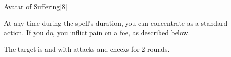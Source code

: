 \begin{spellsection}{Avatar of Suffering}[8]
    \begin{spellheader}
    \end{spellheader}
    \begin{spellcontent}
        \begin{spelltargetinginfo}
        \end{spelltargetinginfo}
        \begin{spelleffects}
            \spelleffect At any time during the spell's duration, you can concentrate as a standard action. If you do, you inflict pain on a foe, as described below.
            \spelldur \durlong
        \end{spelleffects}
    \end{spellcontent}
    \begin{spellsubcontent}
        \begin{spelltargetinginfo}
        \end{spelltargetinginfo}
        \begin{spelleffects}
            \spelleffect The target is \staggered and \impaired with attacks and checks for 2 rounds.
        \end{spelleffects}
    \end{spellsubcontent}
    \begin{spellfooter}
        \miscastexplode
    \end{spellfooter}
    \begin{spellaugments}
    \end{spellaugments}
\end{spellsection}

